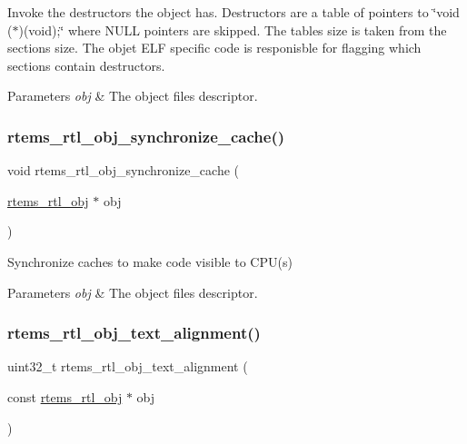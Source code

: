 Invoke the destructors the object has. Destructors are a table of pointers to \char`\"{}void ($\ast$)(void);\char`\"{} where N\+U\+LL pointers are skipped. The table\textquotesingle{}s size is taken from the section\textquotesingle{}s size. The objet E\+LF specific code is responisble for flagging which sections contain destructors.


\begin{DoxyParams}{Parameters}
{\em obj} & The object file\textquotesingle{}s descriptor. \\
\hline
\end{DoxyParams}
\mbox{\label{rtl-obj_8c_a98c2a1b1a67add778c0b4017976f91c3}} 
\subsubsection{\texorpdfstring{rtems\_rtl\_obj\_synchronize\_cache()}{rtems\_rtl\_obj\_synchronize\_cache()}}
{\footnotesize\ttfamily void rtems\+\_\+rtl\+\_\+obj\+\_\+synchronize\+\_\+cache (\begin{DoxyParamCaption}\item[{\mbox{\hyperlink{structrtems__rtl__obj}{rtems\+\_\+rtl\+\_\+obj}} $\ast$}]{obj }\end{DoxyParamCaption})}

Synchronize caches to make code visible to C\+P\+U(s)


\begin{DoxyParams}{Parameters}
{\em obj} & The object file\textquotesingle{}s descriptor. \\
\hline
\end{DoxyParams}
\mbox{\label{rtl-obj_8c_a21f97e47f7caa7bb88f685f2b5b7d18b}} 
\subsubsection{\texorpdfstring{rtems\_rtl\_obj\_text\_alignment()}{rtems\_rtl\_obj\_text\_alignment()}}
{\footnotesize\ttfamily uint32\+\_\+t rtems\+\_\+rtl\+\_\+obj\+\_\+text\+\_\+alignment (\begin{DoxyParamCaption}\item[{const \mbox{\hyperlink{structrtems__rtl__obj}{rtems\+\_\+rtl\+\_\+obj}} $\ast$}]{obj }\end{DoxyParamCaption})}

